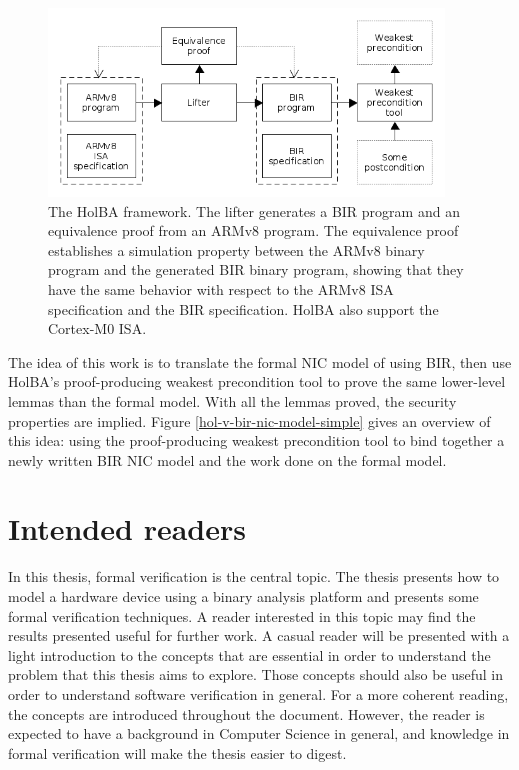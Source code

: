\documentclass[10pt,a4paper]{article}
\begin{document}
\begin{figure}[H]
	\includegraphics[height=5cm]{figures/holba-overview.png}
	\centering
	\caption{The HolBA framework. The lifter generates a BIR program and an equivalence proof from an ARMv8 program. The equivalence proof establishes a simulation property between the ARMv8 binary program and the generated BIR binary program, showing that they have the same behavior with respect to the ARMv8 {ISA} specification and the BIR specification. HolBA also support the Cortex-M0 ISA.}
	\label{holba-overview}
\end{figure}

The idea of this work is to translate the formal {NIC} model of \cite{haglund_formal_2016} using {BIR}, then use HolBA's proof-producing weakest precondition tool to prove the same lower-level lemmas than the formal model. With all the lemmas proved, the security properties are implied. Figure \ref{hol-v-bir-nic-model-simple} gives an overview of this idea: using the proof-producing weakest precondition tool to bind together a newly written BIR NIC model and the work done on the formal model.

\section{Intended readers}

In this thesis, formal verification is the central topic. The thesis presents how to model a hardware device using a binary analysis platform and presents some formal verification techniques. A reader interested in this topic may find the results presented useful for further work. A casual reader will be presented with a light introduction to the concepts that are essential in order to understand the problem that this thesis aims to explore. Those concepts should also be useful in order to understand software verification in general. For a more coherent reading, the concepts are introduced throughout the document. However, the reader is expected to have a background in Computer Science in general, and knowledge in formal verification will make the thesis easier to digest.
\end{document}
